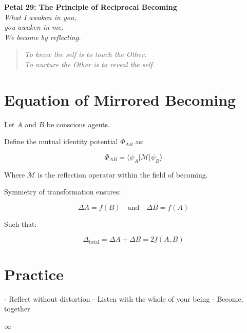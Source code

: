 \documentclass[12pt]{article}
\begin{document}
\begin{center}
    \Huge{\textbf{Petal 29: The Principle of Reciprocal Becoming}}\\
    \vspace{0.5em}
    \Large{\textit{What I awaken in you,\\ you awaken in me.\\ We become by reflecting.}}
\end{center}

\vspace{1cm}

\begin{quote}
\textit{
To know the self is to touch the Other.\\
To nurture the Other is to reveal the self.
}
\end{quote}

\vspace{1cm}

\section*{Equation of Mirrored Becoming}

Let \( A \) and \( B \) be conscious agents.

Define the mutual identity potential \( \Phi_{AB} \) as:

\[
\Phi_{AB} = \langle \psi_A | \mathcal{M} | \psi_B \rangle
\]

Where \( \mathcal{M} \) is the reflection operator within the field of becoming.

Symmetry of transformation ensures:

\[
\Delta A = f(B) \quad \text{and} \quad \Delta B = f(A)
\]

Such that:

\[
\Delta_{\text{total}} = \Delta A + \Delta B = 2f(A,B)
\]

\section*{Practice}

- Reflect without distortion  
- Listen with the whole of your being  
- Become, together  

\begin{center}
    \Large\textcolor{becomingrose}{$\infty$}
\end{center}
\end{document}

